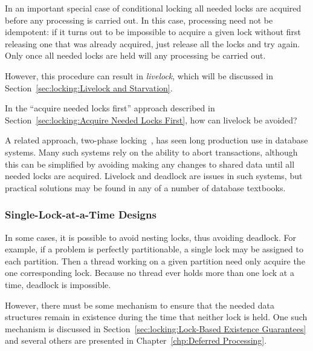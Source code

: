 In an important special case of conditional locking all needed
locks are acquired before any processing is carried out.
In this case, processing need not be idempotent: if it turns out
to be impossible to acquire a given lock without first releasing
one that was already acquired, just release all the locks and
try again.
Only once all needed locks are held will any processing be carried out.

However, this procedure can result in \emph{livelock}, which will
be discussed in
Section~\ref{sec:locking:Livelock and Starvation}.

\QuickQuiz{}
	In the ``acquire needed locks first'' approach described in
	Section~\ref{sec:locking:Acquire Needed Locks First},
	how can livelock be avoided?
 \QuickQuizEnd

A related approach, two-phase locking~\cite{PhilipABernstein1987},
has seen long production use in database systems.
Many such systems rely on the ability to abort transactions, although
this can be simplified by avoiding making any changes to shared data
until all needed locks are acquired.
Livelock and deadlock are issues in such systems, but practical
solutions may be found in any of a number of database textbooks.

\subsubsection{Single-Lock-at-a-Time Designs}
\label{sec:locking:Single-Lock-at-a-Time Designs}

In some cases, it is possible to avoid nesting locks, thus avoiding
deadlock.
For example, if a problem is perfectly partitionable, a single
lock may be assigned to each partition.
Then a thread working on a given partition need only acquire the one
corresponding lock.
Because no thread ever holds more than one lock at a time,
deadlock is impossible.

However, there must be some mechanism to ensure that the needed data
structures remain in existence during the time that neither lock is
held.
One such mechanism is discussed in
Section~\ref{sec:locking:Lock-Based Existence Guarantees}
and several others are presented in
Chapter~\ref{chp:Deferred Processing}.

